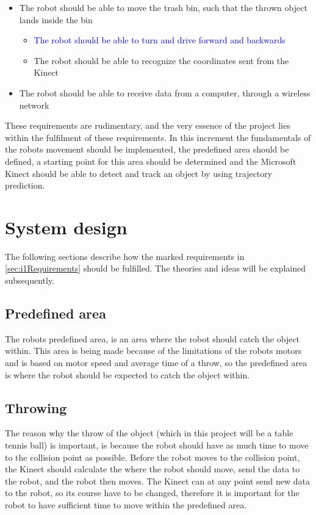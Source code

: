 \begin{itemize}
\begin{itemize}
	\end{itemize}
	\item The robot should be able to move the trash bin, such that the thrown object lands inside the bin
	\begin{itemize}
		\item \textcolor{blue}{The robot should be able to turn and drive forward and backwards}
		\item {The robot should be able to recognize the coordinates sent from the Kinect}
	\end{itemize}
	\item {The robot should be able to receive data from a computer, through a wireless network}
\end{itemize}

These requirements are rudimentary, and the very essence of the project lies within the fulfilment of these requirements. In this increment the fundamentals of the robots movement should be implemented, the predefined area should be defined, a starting point for this area should be determined and the Microsoft Kinect should be able to detect and track an object by using trajectory prediction.

\section{System design}
\label{sec:i1System Design}
The following sections describe how the marked requirements in \ref{sec:i1Requirements} should be fulfilled. The theories and ideas will be explained subsequently.

\subsection{Predefined area}
\label{sec:i1Predefined area}
The robots predefined area, is an area where the robot should catch the object within. This area is being made because of the limitations of the robots motors and is based on motor speed and average time of a throw, so the predefined area is where the robot should be expected to catch the object within.

\subsection{Throwing}
\label{sec:i1Throwing}
The reason why the throw of the object (which in this project will be a table tennis ball) is important, is because the robot should have as much time to move to the collision point as possible. Before the robot moves to the collision point, the Kinect should calculate the where the robot should move, send the data to the robot, and the robot then moves. The Kinect can at any point send new data to the robot, so its course have to be changed, therefore it is important for the robot to have sufficient time to move within the predefined area.    


